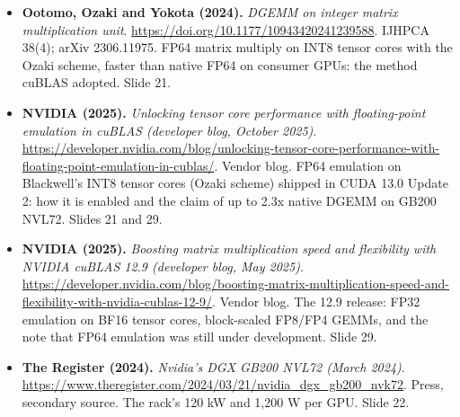 \begin{itemize}[leftmargin=1.2em,itemsep=3pt]
\item \textbf{Ootomo, Ozaki and Yokota (2024).} \textit{DGEMM on integer matrix multiplication unit}. \url{https://doi.org/10.1177/10943420241239588}. IJHPCA 38(4); arXiv 2306.11975. FP64 matrix multiply on INT8 tensor cores with the Ozaki scheme, faster than native FP64 on consumer GPUs: the method cuBLAS adopted. Slide 21.
\item \textbf{NVIDIA (2025).} \textit{Unlocking tensor core performance with floating-point emulation in cuBLAS (developer blog, October 2025)}. \url{https://developer.nvidia.com/blog/unlocking-tensor-core-performance-with-floating-point-emulation-in-cublas/}. Vendor blog. FP64 emulation on Blackwell's INT8 tensor cores (Ozaki scheme) shipped in CUDA 13.0 Update 2: how it is enabled and the claim of up to 2.3x native DGEMM on GB200 NVL72. Slides 21 and 29.
\item \textbf{NVIDIA (2025).} \textit{Boosting matrix multiplication speed and flexibility with NVIDIA cuBLAS 12.9 (developer blog, May 2025)}. \url{https://developer.nvidia.com/blog/boosting-matrix-multiplication-speed-and-flexibility-with-nvidia-cublas-12-9/}. Vendor blog. The 12.9 release: FP32 emulation on BF16 tensor cores, block-scaled FP8/FP4 GEMMs, and the note that FP64 emulation was still under development. Slide 29.
\item \textbf{The Register (2024).} \textit{Nvidia's DGX GB200 NVL72 (March 2024)}. \url{https://www.theregister.com/2024/03/21/nvidia_dgx_gb200_nvk72}. Press, secondary source. The rack's 120 kW and 1,200 W per GPU. Slide 22.
\end{itemize}
